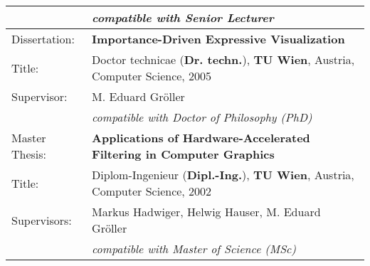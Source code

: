 \documentclass[a4paper,11pt]{letter}
\begin{document}
\begin{tabular}{l|l}
     &  \emph{compatible with Senior Lecturer}\\
\hline
Dissertation:      & \textbf{Importance-Driven Expressive Visualization} \\
Title: & Doctor technicae (\textbf{Dr. techn.}), \textbf{TU Wien}, Austria, Computer Science, 2005 \\
Supervisor:  & M. Eduard Gröller \\
     & \emph{compatible with Doctor of Philosophy (PhD)}\\
\hline
Master Thesis: & \textbf{Applications of Hardware-Accelerated Filtering in Computer Graphics} \\
Title: & Diplom-Ingenieur (\textbf{Dipl.-Ing.}), \textbf{TU Wien}, Austria, Computer Science, 2002 \\
Supervisors:      & Markus Hadwiger, Helwig Hauser, M. Eduard Gröller \\
     & \emph{compatible with Master of Science (MSc)}\\
\end{tabular}
\end{document}
